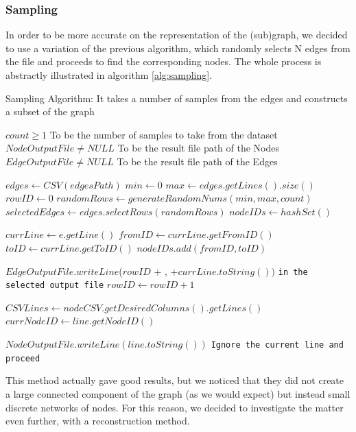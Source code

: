\documentclass[sigconf, nonacm]{acmart}
\begin{document}
\subsubsection{Sampling} 
In order to be more accurate on the representation of the (sub)graph, we decided to use a variation of the previous algorithm, which randomly selects N edges from the file and proceeds to find the corresponding nodes. The whole process is abstractly illustrated in algorithm \ref{alg:sampling}.
\begin{algorithm}
\caption{Sampling Algorithm: It takes a number of samples from the edges and constructs a subset of the graph}\label{alg:sampling}
\begin{algorithmic}

\Require $count \geq 1$ To be the number of samples to take from the dataset
\Require $NodeOutputFile \neq NULL$ To be the result file path of the Nodes
\Require $EdgeOutputFile \neq NULL$ To be the result file path of the Edges

\State
\State $edges \gets CSV(edgesPath)$
\State $min \gets 0$
\State $max \gets edges.getLines().size()$
\State $rowID \gets 0$
\State $randomRows \gets generateRandomNums(min,max,count)$
\State $selectedEdges \gets edges.selectRows(randomRows)$
\State $nodeIDs \gets hashSet()$

\State
{}
    \State $currLine \gets e.getLine()$
    \State $fromID \gets currLine.getFromID()$
    \State $toID \gets currLine.getToID()$
    \State$nodeIDs.add(fromID, toID)$
    
    \State $EdgeOutputFile.writeLine$($rowID$ + , +$currLine.toString())$
    \texttt{in the selected output file}
    \State $rowID \gets rowID+1$
\EndFor

\State
{}

    \State $CSVLines \gets nodeCSV.getDesiredColumns().getLines()$
        \State $currNodeID \gets line.getNodeID()$
        
            \State $NodeOutputFile.writeLine(line.toString())$
        \Else
           \State \texttt{Ignore the current line and proceed}
        \EndIf
        
    \EndFor
\EndFor

\end{algorithmic}
\end{algorithm}
This method actually gave good results, but we noticed that they did not create a large connected component of the graph (as we would expect) but instead small discrete networks of nodes. For this reason, we decided to investigate the matter even further, with a reconstruction method.
\end{document}

